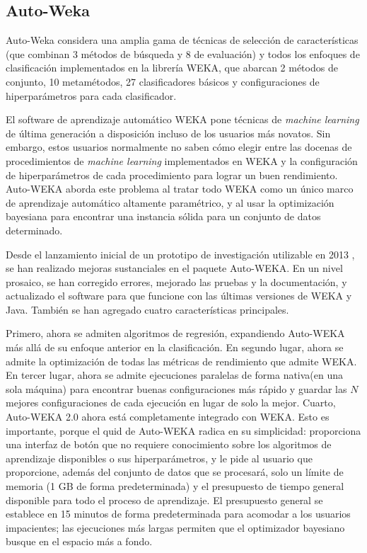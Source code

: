 \subsection{Auto-Weka} 
Auto-Weka \parencite{13} considera una amplia gama de técnicas de selección de características (que combinan 3 métodos de búsqueda y 8 de evaluación) y todos los enfoques de clasificación implementados en la librería WEKA, que abarcan 2 métodos de conjunto, 10 metamétodos, 27 clasificadores básicos y configuraciones de hiperparámetros para cada clasificador.   

El software de aprendizaje automático WEKA pone técnicas de \textit{machine learning} de última generación a disposición incluso de los usuarios más novatos. Sin embargo, estos usuarios normalmente no saben cómo elegir entre las docenas de procedimientos de \textit{machine learning} implementados en WEKA y la configuración de hiperparámetros de cada procedimiento para lograr un buen rendimiento. Auto-WEKA aborda este problema al tratar todo WEKA como un único marco de aprendizaje automático altamente paramétrico, y al usar la optimización bayesiana para encontrar una instancia sólida para un conjunto de datos determinado.

Desde el lanzamiento inicial de un prototipo de investigación utilizable en 2013 \parencite{13}, se han realizado mejoras sustanciales en el paquete Auto-WEKA. En un nivel prosaico, se han corregido errores, mejorado las pruebas y la documentación, y actualizado el software para que funcione con las últimas versiones de WEKA y Java. También se han agregado cuatro características principales.

Primero, ahora se admiten algoritmos de regresión, expandiendo Auto-WEKA más allá de su enfoque anterior en la clasificación. En segundo lugar, ahora se admite la optimización de todas las métricas de rendimiento que admite WEKA. En tercer lugar, ahora se admite ejecuciones paralelas de forma nativa(en una sola máquina) para encontrar buenas configuraciones más rápido y guardar las $N$ mejores configuraciones de cada ejecución en lugar de solo la mejor. Cuarto, Auto-WEKA 2.0 ahora está completamente integrado con WEKA. Esto es importante, porque el quid de Auto-WEKA radica en su simplicidad: proporciona una interfaz de botón que no requiere conocimiento sobre los algoritmos de aprendizaje disponibles o sus hiperparámetros, y le pide al usuario que proporcione, además del conjunto de datos que se procesará, solo un límite de memoria (1 GB de forma predeterminada) y el presupuesto de tiempo general disponible para todo el proceso de aprendizaje. El presupuesto general se establece en 15 minutos de forma predeterminada para acomodar a los usuarios impacientes; las ejecuciones más largas permiten que el optimizador bayesiano busque en el espacio más a fondo.

